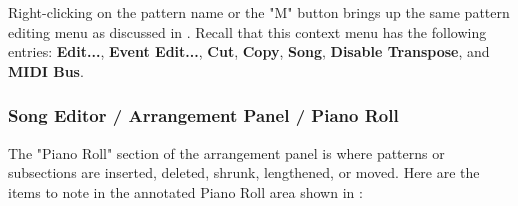    Right-clicking on the pattern name or the "M" button brings up the same
   pattern editing menu as discussed in
   .
   Recall that this context menu has the following entries:
   \textbf{Edit...}, \textbf{Event Edit...}, \textbf{Cut}, \textbf{Copy},
   \textbf{Song}, \textbf{Disable Transpose}, and \textbf{MIDI Bus}.

\subsubsection{Song Editor / Arrangement Panel / Piano Roll}
\label{subsubsec:seq64_song_editor_arrangement_panel_roll}

   The "Piano Roll" section of the arrangement panel is where patterns or
   subsections are inserted, deleted, shrunk, lengthened, or moved.
   Here are the items to note in the annotated Piano Roll area
   shown in :

